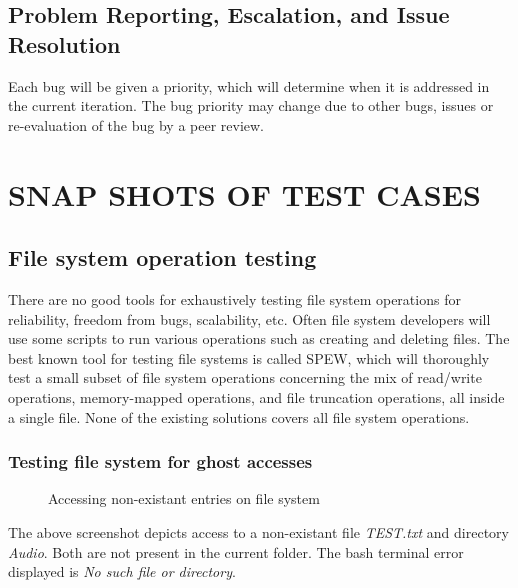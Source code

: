 \subsection{Problem Reporting, Escalation, and Issue Resolution}
Each bug will be given a priority, which will determine when it is addressed in the current iteration. The bug priority may change due to other bugs, issues or re-evaluation of the bug by a peer review.

\section*{SNAP SHOTS OF TEST CASES}
\subsection{File system operation testing}
There are no good tools for exhaustively testing file system operations for reliability, freedom from bugs, scalability, etc. Often file system developers will use some scripts to run various operations such as creating and deleting files. The best known tool for testing file systems is called SPEW, which will thoroughly test a small subset of file system operations concerning the mix of read/write operations, memory-mapped operations, and file truncation operations, all inside a single file. None of the existing solutions covers all file system operations.

\newpage
\subsubsection{Testing file system for ghost accesses}
\begin{figure}[htb]
\centering
\setlength\fboxsep{0pt}
\setlength\fboxrule{0.5pt}
\caption{Accessing non-existant entries on file system}
\label{fig:dfd0}
\end{figure}
The above screenshot depicts access to a non-existant file \emph{TEST.txt} and directory \emph{Audio}. Both are not present in the current folder. The bash terminal error displayed is \emph{No such file or directory}.

